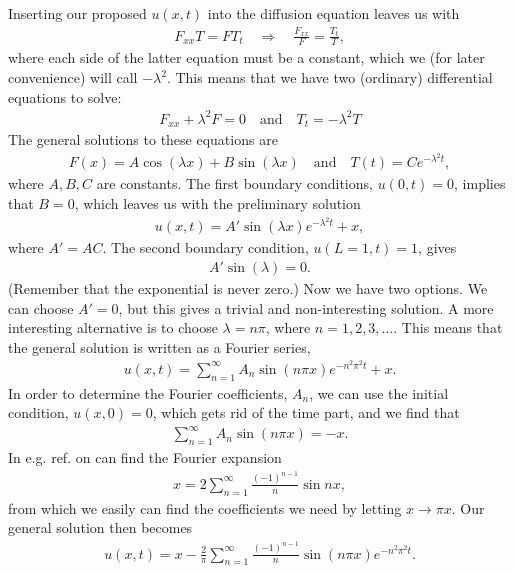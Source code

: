 \documentclass[12pt, a4paper]{article}
\begin{document}
Inserting our proposed $u(x,t)$ into the diffusion equation leaves us with 
\begin{align*}
F_{xx} T = F T_t \quad \Rightarrow \quad \frac{F_{xx}}{F} = \frac{T_t}{T}, 
\end{align*} 
where each side of the latter equation must be a constant, which we (for later convenience) will call 
$-\lambda^2$. This means that we have two (ordinary) differential equations to solve: 
\begin{align*}
F_{xx} + \lambda^2 F = 0 \quad \text{and} \quad T_t = -\lambda^2 T 
\end{align*}  
The general solutions to these equations are 
\begin{align*}
F(x) = A \cos(\lambda x) + B \sin (\lambda x)  \quad \text{and} \quad  T(t) = C e^{-\lambda^2t}, 
\end{align*}
where $A,B,C$ are constants. The first boundary conditions, $u(0,t)=0$, implies that $B=0$, which leaves 
us with the preliminary solution 
\begin{align*}
u(x,t) = A' \sin(\lambda x) e^{-\lambda^2 t} + x,   
\end{align*}
where $A' = AC$. The second boundary condition, $u(L=1, t)=1$, gives 
\begin{align*}
A'\sin (\lambda) = 0.  
\end{align*}
(Remember that the exponential is never zero.)
Now we have two options. We can choose $A'=0$, but this gives a trivial and non-interesting solution. A 
more interesting alternative is to choose $\lambda = n\pi$, where $n=1,2,3,\dots$. This means 
that the general solution is written as a Fourier series, 
\begin{align*}
u(x,t) = \sum_{n=1}^\infty A_n \sin(n\pi x) e^{-n^2\pi^2t} + x. 
\end{align*}  
In order to determine the Fourier coefficients, $A_n$, we can use the initial condition, $u(x,0)=0$, 
which gets rid of the time part, and we find that 
\begin{align*}
\sum_{n=1}^\infty A_n \sin(n\pi x) = -x. 
\end{align*}  
In e.g. ref. \cite{Rottmann} on can find the Fourier expansion 
\begin{align*}
x = 2 \sum_{n=1}^\infty \frac{(-1)^{n-1}}{n} \sin nx,   
\end{align*} 
from which we easily can find the coefficients we need by letting $x\rightarrow \pi x$. Our general 
solution then becomes 
\begin{align*}
u(x,t) = x - \frac{2}{\pi} \sum_{n=1}^\infty \frac{(-1)^{n-1}}{n} \sin(n\pi x) e^{-n^2\pi^2t}. 
\end{align*}
\end{document}
